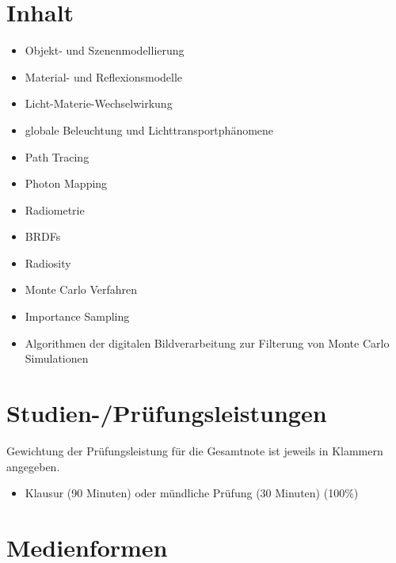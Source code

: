 \section*{Inhalt\label{/mi-2017/modulbeschreibungen-master/MA_VC_Modul_PhotorealistischeBildsynthese}}\label{inhaltpathlabelmi-2017modulbeschreibungen-mastermaux5fvcux5fmodulux5fphotorealistischebildsynthese}

\begin{itemize}
\tightlist
\item
  Objekt- und Szenenmodellierung
\item
  Material- und Reflexionsmodelle
\item
  Licht-Materie-Wechselwirkung
\item
  globale Beleuchtung und Lichttransportphänomene
\item
  Path Tracing
\item
  Photon Mapping
\item
  Radiometrie
\item
  BRDFs
\item
  Radiosity
\item
  Monte Carlo Verfahren
\item
  Importance Sampling
\item
  Algorithmen der digitalen Bildverarbeitung zur Filterung von Monte
  Carlo Simulationen
\end{itemize}

\section*{Studien-/Prüfungsleistungen\label{/mi-2017/modulbeschreibungen-master/MA_VC_Modul_PhotorealistischeBildsynthese}}\label{studien-pruxfcfungsleistungenpathlabelmi-2017modulbeschreibungen-mastermaux5fvcux5fmodulux5fphotorealistischebildsynthese}

Gewichtung der Prüfungsleistung für die Gesamtnote ist jeweils in
Klammern angegeben.

\begin{itemize}
\tightlist
\item
  Klausur (90 Minuten) oder mündliche Prüfung (30 Minuten) (100\%)
\end{itemize}

\section*{Medienformen\label{/mi-2017/modulbeschreibungen-master/MA_VC_Modul_PhotorealistischeBildsynthese}}\label{medienformenpathlabelmi-2017modulbeschreibungen-mastermaux5fvcux5fmodulux5fphotorealistischebildsynthese}

